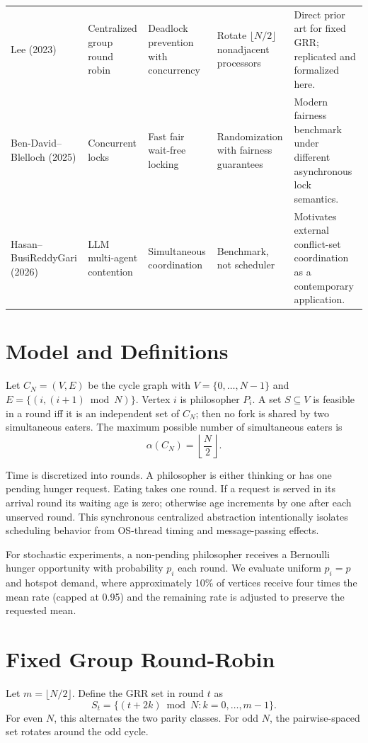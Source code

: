 \documentclass[10pt,journal]{IEEEtran}
\begin{document}
\begin{table}[t]
\begin{tabular}{p{2.4cm}p{2.5cm}p{2.4cm}p{2.3cm}p{5.0cm}}
Lee (2023) \cite{lee2023} & Centralized group round robin & Deadlock prevention with concurrency & Rotate $\lfloor N/2\rfloor$ nonadjacent processors & Direct prior art for fixed GRR; replicated and formalized here.\\
Ben-David--Blelloch (2025) \cite{bendavid2025} & Concurrent locks & Fast fair wait-free locking & Randomization with fairness guarantees & Modern fairness benchmark under different asynchronous lock semantics.\\
Hasan--BusiReddyGari (2026) \cite{hasan2026} & LLM multi-agent contention & Simultaneous coordination & Benchmark, not scheduler & Motivates external conflict-set coordination as a contemporary application.\\
\bottomrule
\end{tabular}
\end{table}

\section{Model and Definitions}
Let $C_N=(V,E)$ be the cycle graph with $V=\{0,\dots,N-1\}$ and $E=\{(i,(i+1)\bmod N)\}$. Vertex $i$ is philosopher $P_i$. A set $S\subseteq V$ is feasible in a round iff it is an independent set of $C_N$; then no fork is shared by two simultaneous eaters. The maximum possible number of simultaneous eaters is
\begin{equation}
\alpha(C_N)=\left\lfloor\frac{N}{2}\right\rfloor.
\end{equation}

Time is discretized into rounds. A philosopher is either thinking or has one pending hunger request. Eating takes one round. If a request is served in its arrival round its waiting age is zero; otherwise age increments by one after each unserved round. This synchronous centralized abstraction intentionally isolates scheduling behavior from OS-thread timing and message-passing effects.

For stochastic experiments, a non-pending philosopher receives a Bernoulli hunger opportunity with probability $p_i$ each round. We evaluate uniform $p_i=p$ and hotspot demand, where approximately 10\% of vertices receive four times the mean rate (capped at 0.95) and the remaining rate is adjusted to preserve the requested mean.

\section{Fixed Group Round-Robin}
Let $m=\lfloor N/2\rfloor$. Define the GRR set in round $t$ as
\begin{equation}
S_t=\{(t+2k)\bmod N: k=0,\dots,m-1\}.
\end{equation}
For even $N$, this alternates the two parity classes. For odd $N$, the pairwise-spaced set rotates around the odd cycle.
\end{document}
